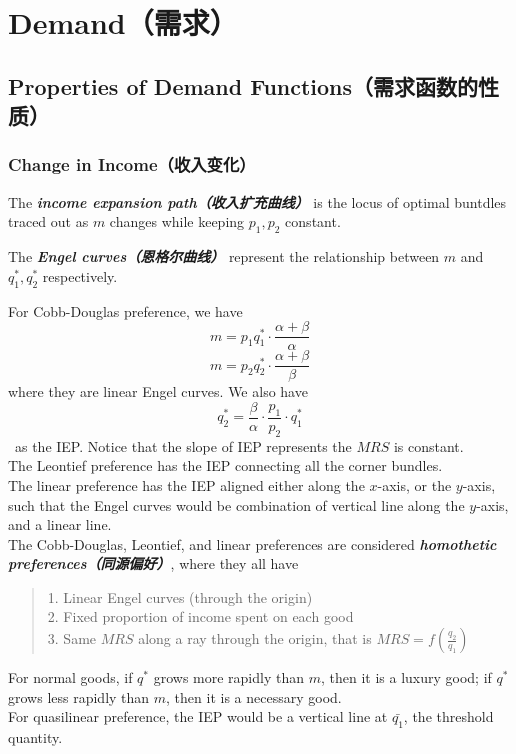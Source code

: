 \section{Demand（需求）}
\subsection{Properties of Demand Functions（需求函数的性质）}
\subsubsection{Change in Income（收入变化）}
\begin{definition}
    The \textbf{\textit{income expansion path（收入扩充曲线）}} is the locus of optimal buntdles traced out as $m$ changes while keeping $p_1, p_2$ constant.
\end{definition}
\begin{definition}
    The \textbf{\textit{Engel curves（恩格尔曲线）}} represent the relationship between $m$ and $q_1^{*}, q_2^{*}$ respectively.
\end{definition}
For Cobb-Douglas preference, we have
$$m = p_1q_1^{*} \cdot \frac{\alpha + \beta}{\alpha}$$
$$m = p_2q_2^{*} \cdot \frac{\alpha + \beta}{\beta}$$
where they are linear Engel curves. We also have
$$q_2^{*} = \frac{\beta}{\alpha} \cdot \frac{p_1}{p_2} \cdot q_1^{*}$$\
as the IEP. Notice that the slope of IEP represents the $MRS$ is constant. \\
The Leontief preference has the IEP connecting all the corner bundles. \\
The linear preference has the IEP aligned either along the $x$-axis, or the $y$-axis, such that the Engel curves would be combination of vertical line along the $y$-axis, and a linear line. \\
The Cobb-Douglas, Leontief, and linear preferences are considered \textbf{\textit{homothetic preferences（同源偏好）}}, where they all have
\begin{quote}
    1. Linear Engel curves (through the origin) \\
    2. Fixed proportion of income spent on each good \\
    3. Same $MRS$ along a ray through the origin, that is $MRS = f(\frac{q_2}{q_1})$
\end{quote}
For normal goods, if $q^{*}$ grows more rapidly than $m$, then it is a luxury good; if $q^{*}$ grows less rapidly than $m$, then it is a necessary good. \\
For quasilinear preference, the IEP would be a vertical line at $\bar{q_1}$, the threshold quantity.

